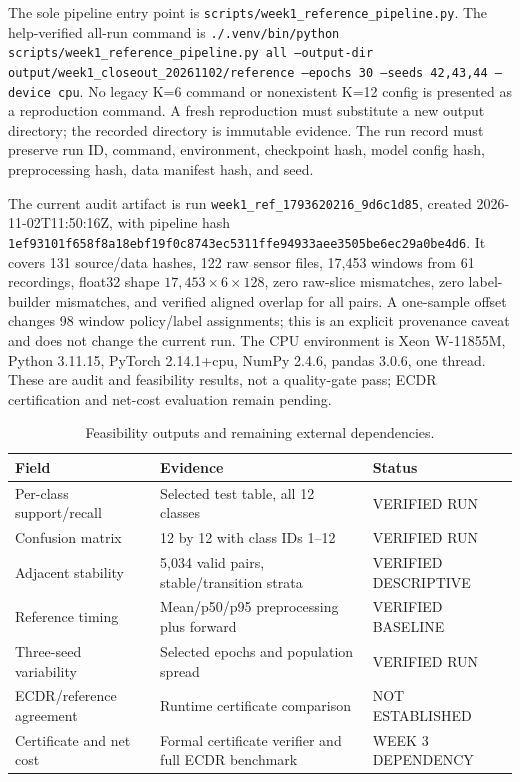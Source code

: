 \documentclass[11pt,a4paper]{article}
\begin{document}
The sole pipeline entry point is \texttt{scripts/week1\_reference\_pipeline.py}.
The help-verified all-run command is
\texttt{./.venv/bin/python scripts/week1\_reference\_pipeline.py all --output-dir
output/week1\_closeout\_20261102/reference --epochs 30 --seeds 42,43,44 --device
cpu}. No legacy K=6 command or nonexistent K=12 config is presented as a
reproduction command. A fresh reproduction must substitute a new output
directory; the recorded directory is immutable evidence. The run record must preserve run ID, command,
environment, checkpoint hash, model config hash, preprocessing hash, data
manifest hash, and seed.

The current audit artifact is run \texttt{week1\_ref\_1793620216\_9d6c1d85},
created 2026-11-02T11:50:16Z, with pipeline hash
\nolinkurl{1ef93101f658f8a18ebf19f0c8743ec5311ffe94933aee3505be6ec29a0be4d6}.
It covers 131 source/data hashes, 122 raw sensor files, 17,453 windows from 61
recordings, float32 shape $17{,}453\times6\times128$, zero raw-slice
mismatches, zero label-builder mismatches, and verified aligned overlap for all
pairs. A one-sample offset changes 98 window policy/label assignments; this is
an explicit provenance caveat and does not change the current run. The CPU
environment is Xeon W-11855M, Python 3.11.15, PyTorch 2.14.1+cpu, NumPy 2.4.6,
pandas 3.0.6, one thread. These are audit and feasibility results, not a
quality-gate pass; ECDR certification and net-cost evaluation remain pending.

\begin{table}[ht]\centering\small
\caption{Feasibility outputs and remaining external dependencies.}\begin{tabularx}{\linewidth}{@{}lYY@{}}\toprule
Field & Evidence & Status\\\midrule
Per-class support/recall & Selected test table, all 12 classes & VERIFIED RUN\\
Confusion matrix & 12 by 12 with class IDs 1--12 & VERIFIED RUN\\
Adjacent stability & 5,034 valid pairs, stable/transition strata & VERIFIED DESCRIPTIVE\\
Reference timing & Mean/p50/p95 preprocessing plus forward & VERIFIED BASELINE\\
Three-seed variability & Selected epochs and population spread & VERIFIED RUN\\
ECDR/reference agreement & Runtime certificate comparison & NOT ESTABLISHED\\
Certificate and net cost & Formal certificate verifier and full ECDR benchmark & WEEK 3 DEPENDENCY\\\bottomrule
\end{tabularx}\end{table}
\end{document}
